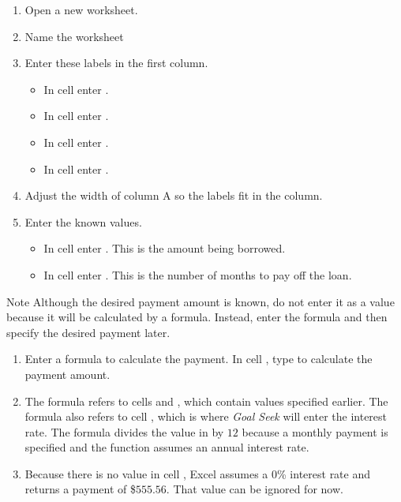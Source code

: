 \begin{enumerate}
	\item Open a new worksheet.
	\item Name the worksheet 
	\item Enter these labels in the first column.

	\begin{itemize}
		\item In cell  enter .
		\item In cell  enter .
		\item In cell  enter .
		\item In cell  enter .
	\end{itemize}

	\item Adjust the width of column A so the labels fit in the column.
	\item Enter the known values.

\begin{itemize}
	\item In cell  enter . This is the amount being borrowed.
	\item In cell  enter . This is the number of months to pay off the loan. 
\end{itemize}
\end{enumerate}

\begin{center}
	\begin{infobox}{Note}
		Although the desired payment amount is known, do not enter it as a value because it will be calculated by a formula. Instead, enter the formula and then specify the desired payment later.
	\end{infobox}
\end{center}

\begin{enumerate}[resume]
	\item Enter a formula to calculate the payment. In cell , type  to calculate the payment amount.
	\item The formula refers to cells  and , which contain values specified earlier. The formula also refers to cell , which is where \textit{Goal Seek} will enter the interest rate. The formula divides the value in  by $ 12 $ because a monthly payment is specified and the  function assumes an annual interest rate.
	\item Because there is no value in cell , Excel assumes a $ 0 $\% interest rate and returns a payment of \$$ 555.56 $. That value can be ignored for now.
\end{enumerate}

